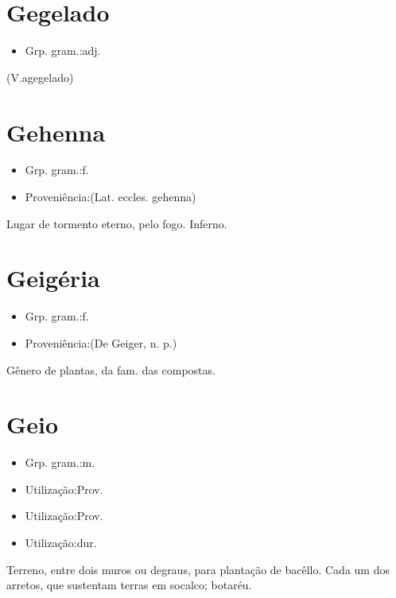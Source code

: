 \section{Gegelado}
\begin{itemize}
\item {Grp. gram.:adj.}
\end{itemize}
(V.agegelado)
\section{Gehenna}
\begin{itemize}
\item {Grp. gram.:f.}
\end{itemize}
\begin{itemize}
\item {Proveniência:(Lat. eccles. \textunderscore gehenna\textunderscore )}
\end{itemize}
Lugar de tormento eterno, pelo fogo.
Inferno.
\section{Geigéria}
\begin{itemize}
\item {Grp. gram.:f.}
\end{itemize}
\begin{itemize}
\item {Proveniência:(De \textunderscore Geiger\textunderscore , n. p.)}
\end{itemize}
Gênero de plantas, da fam. das compostas.
\section{Geio}
\begin{itemize}
\item {Grp. gram.:m.}
\end{itemize}
\begin{itemize}
\item {Utilização:Prov.}
\end{itemize}
\begin{itemize}
\item {Utilização:Prov.}
\end{itemize}
\begin{itemize}
\item {Utilização:dur.}
\end{itemize}
Terreno, entre dois muros ou degraus, para plantação de bacêllo.
Cada um dos arretos, que sustentam terras em socalco; botaréu.
